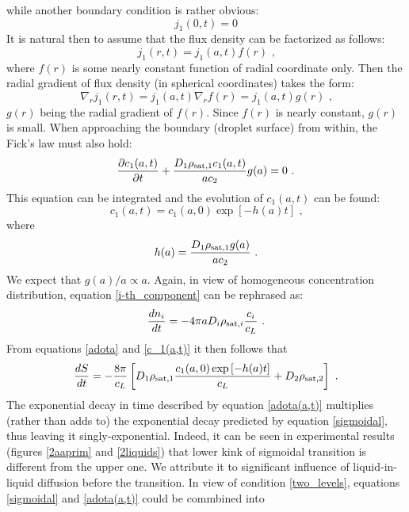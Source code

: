\documentclass[twoside,twocolumn,9pt]{article}
\begin{document}
while another boundary condition is rather obvious:
\begin{equation}
j_1(0,t)=0 
\end{equation}
It is natural then to assume that the flux density can be factorized as follows:
\begin{equation}
j_1(r,t) = j_1(a,t) f(r) \mbox{ ,}
\end{equation}
where $f(r)$ is some nearly constant function of radial coordinate only. Then the radial gradient of flux density (in spherical coordinates) takes the form:
\begin{equation}
\nabla _r j_1(r,t) = j_1(a,t) \nabla _r f(r) = j_1(a,t) g(r) \mbox{ ,}
\end{equation}
$g(r)$ being the radial gradient of $f(r)$. Since $f(r)$ is nearly constant, $g(r)$ is small. When approaching the boundary (droplet surface) from within, the Fick's law must also hold:
\begin{equation}
\frac{\partial c_1(a,t)}{\partial t} + \frac{D_1 \rho_{{\rm sat},1} c_1(a,t)}{a c_2} g(a) = 0 \mbox{ .}
\end{equation}
This equation can be integrated and the evolution of $c_1(a,t)$ can be found:
\begin{equation}
c_1(a,t) = c_1(a,0) \exp \left[ -h(a)t \right] \mbox{ ,}
\label{c_1(a,t)}
\end{equation}
where 
\begin{equation*}
h(a) = \frac{D_1 \rho_{{\rm sat},1} g(a)}{a c_2} \mbox{ .}
\end{equation*}
We expect that $g(a)/a\propto a$. Again, in view of homogeneous concentration distribution, equation \ref{i-th_component} can be rephrased as:
\begin{equation}
\frac{dn_i}{dt} = -4\pi a D_i\rho_{{\rm sat},i} \frac{c_i}{c_L} \mbox{~.}
\end{equation}
From equations \ref{adota} and \ref{c_1(a,t)} it then follows that
\begin{equation}
\frac{dS}{dt} = -\frac{8\pi}{c_L} \left[ D_1\rho_{{\rm sat},1} \frac{c_1(a,0) \exp \left[ -h(a)t \right]}{c_L} + D_2\rho_{{\rm sat},2} \right] \mbox{ .}
\label{adota(a,t)}
\end{equation}
The exponential decay in time described by equation \ref{adota(a,t)} multiplies (rather than adds to) the exponential decay predicted by equation \ref{sigmoidal}, thus leaving it singly-exponential. Indeed, it can be seen in experimental results (figures \ref{2aaprim} and \ref{2liquids}) that lower kink of sigmoidal transition is different from the upper one. We attribute it to significant influence of liquid-in-liquid diffusion before the transition. In view of condition \ref{two_levels}, equations \ref{sigmoidal} and \ref{adota(a,t)} could be commbined into
\end{document}
